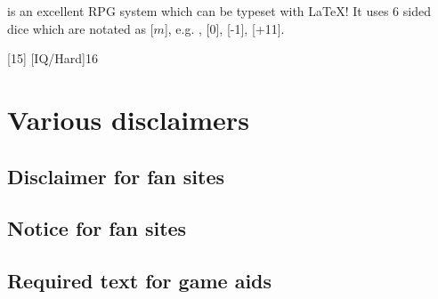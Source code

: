 \documentclass{article}
\begin{document}
\gurps is an excellent RPG system which can be typeset with \LaTeX{}! It uses 6
sided dice which are notated as [$m$], e.g. , [0], [-1], [+11].

\begin{character}
  [15]
  [IQ/Hard]{16}
\end{character}


\section{Various disclaimers}
\label{sec:various-disclaimers}

\subsection{Disclaimer for fan sites}
\label{sec:disclaimer-fan-sites}

\SJGamesOnlinePolicyDisclaimer

\subsection{Notice for fan sites}
\label{sec:disclaimer-fan-sites}

\SJGamesOnlinePolicyNotice

\subsection{Required text for game aids}
\label{sec:disclaimer-fan-sites}

\end{document}

